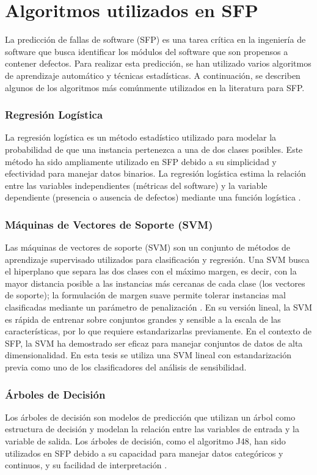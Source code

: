 
\section{Algoritmos utilizados en SFP}
\label{sec:clasificadores_mt}

La predicción de fallas de software (SFP) es una tarea crítica en la ingeniería de software que busca identificar los módulos del software que son propensos a contener defectos. Para realizar esta predicción, se han utilizado varios algoritmos de aprendizaje automático y técnicas estadísticas. A continuación, se describen algunos de los algoritmos más comúnmente utilizados en la literatura para SFP.

\subsubsection{Regresión Logística}
La regresión logística es un método estadístico utilizado para modelar la probabilidad de que una instancia pertenezca a una de dos clases posibles. Este método ha sido ampliamente utilizado en SFP debido a su simplicidad y efectividad para manejar datos binarios. La regresión logística estima la relación entre las variables independientes (métricas del software) y la variable dependiente (presencia o ausencia de defectos) mediante una función logística \cite{kondo2019impact}.

\subsubsection{Máquinas de Vectores de Soporte (SVM)}
Las máquinas de vectores de soporte (SVM) son un conjunto de métodos de aprendizaje supervisado utilizados para clasificación y regresión. Una SVM busca el hiperplano que separa las dos clases con el máximo margen, es decir, con la mayor distancia posible a las instancias más cercanas de cada clase (los vectores de soporte); la formulación de margen suave permite tolerar instancias mal clasificadas mediante un parámetro de penalización \cite{cortes1995}. En su versión lineal, la SVM es rápida de entrenar sobre conjuntos grandes y sensible a la escala de las características, por lo que requiere estandarizarlas previamente. En el contexto de SFP, la SVM ha demostrado ser eficaz para manejar conjuntos de datos de alta dimensionalidad. En esta tesis se utiliza una SVM lineal con estandarización previa como uno de los clasificadores del análisis de sensibilidad.

\subsubsection{Árboles de Decisión}
Los árboles de decisión son modelos de predicción que utilizan un árbol como estructura de decisión y modelan la relación entre las variables de entrada y la variable de salida. Los árboles de decisión, como el algoritmo J48, han sido utilizados en SFP debido a su capacidad para manejar datos categóricos y continuos, y su facilidad de interpretación \cite{RADJENOVIC20131397}.

